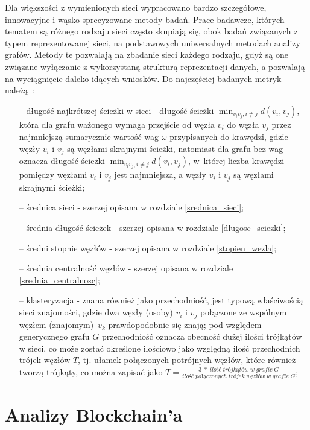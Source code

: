 \documentclass[12pt, oneside, final, openany]{mgr}
\begin{document}
\indent Dla większości z wymienionych sieci wypracowano bardzo szczegółowe, innowacyjne i wąsko sprecyzowane metody badań. Prace badawcze, których tematem są różnego rodzaju sieci często skupiają się, obok badań związanych z typem reprezentowanej sieci, na podstawowych uniwersalnych metodach analizy grafów. Metody te pozwalają na zbadanie sieci każdego rodzaju, gdyż są one związane wyłączanie z wykorzystaną strukturą reprezentacji danych, a pozwalają na wyciągnięcie daleko idących wniosków. Do najczęściej badanych metryk należą~\cite{barabasi2016network, wasserman1994social, Watts1998}:
\begin{itemize}
\item[--] długość najkrótszej ścieżki w sieci - długość ścieżki $\min_{v_iv_j, i \ne j} d(v_i, v_j)$, która dla grafu ważonego wymaga przejście od węzła $v_i$ do węzła $v_j$ przez najmniejszą sumarycznie wartość wag $\omega$ przypisanych do krawędzi, gdzie węzły $v_i$ i $v_j$ są węzłami skrajnymi ścieżki, natomiast dla grafu bez wag oznacza długość ścieżki $\min_{v_iv_j, i \ne j} d(v_i, v_j)$, w~której liczba krawędzi pomiędzy węzłami $v_i$ i $v_j$ jest najmniejsza, a węzły $v_i$ i $v_j$ są węzłami skrajnymi ścieżki;
\item[--] średnica sieci - szerzej opisana w rozdziale \ref{srednica_sieci};
\item[--] średnia długość ścieżek - szerzej opisana w rozdziale \ref{dlugosc_sciezki};
\item[--] średni stopnie węzłów - szerzej opisana w rozdziale \ref{stopien_wezla};
\item[--] średnia centralność węzłów - szerzej opisana w rozdziale \ref{srednia_centralnosc};
\item[--] klasteryzacja - znana również jako przechodniość, jest typową właściwością sieci znajomości, gdzie dwa węzły (osoby) $v_i$ i $v_j$ połączone ze wspólnym węzłem (znajomym)~$v_k$ prawdopodobnie się znają; pod względem generycznego grafu $G$ przechodniość oznacza obecność dużej ilości trójkątów w sieci, co może zostać określone ilościowo jako względną ilość przechodnich trójek węzłów $T$, tj. ułamek połączonych potrójnych węzłów, które również tworzą trójkąty, co można zapisać jako $T = \frac{3\; *\; ilość \; trójkątów \; w \; grafie \; G}{ilość \; połączonych \; trójek \; węzłów \; w \; grafie \; G}$;
\end{itemize}

\if@archive\else\newpage\fi
\section{Analizy Blockchain'a}
\end{document}
